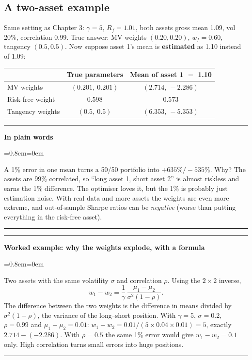 \documentclass[11pt,a4paper]{report}
\newenvironment{notebox}[1]
  {\par\medskip\Needspace{6\baselineskip}\noindent\rule{\linewidth}{0.4pt}\par\nopagebreak
   \noindent\textbf{#1}\par\nopagebreak
   \begin{list}{}{\leftmargin=0.8em\rightmargin=0em\topsep=2pt}\item[]}
  {\end{list}\nopagebreak\noindent\rule{\linewidth}{0.4pt}\par\medskip}
\newenvironment{plainbox}{\begin{notebox}{In plain words}}{\end{notebox}}
\newenvironment{workedex}[1][]{\begin{notebox}{Worked example#1}}{\end{notebox}}
\begin{document}
\subsection{A two-asset example}
Same setting as Chapter 3: $\gamma=5$, $R_f=1.01$, both assets gross mean 1.09, vol
20\%, correlation 0.99. True answer: MV weights $(0.20,0.20)$, $w_f=0.60$,
tangency $(0.5,0.5)$. Now suppose asset 1's mean is \textbf{estimated} as 1.10 instead of 1.09:
\begin{center}
\begin{tabular}{@{}lcc@{}}
\toprule
 & True parameters & Mean of asset 1 $=$ 1.10 \\
\midrule
MV weights & $(0.201,\ 0.201)$ & $(2.714,\ -2.286)$ \\
Risk-free weight & 0.598 & 0.573 \\
Tangency weights & $(0.5,\ 0.5)$ & $(6.353,\ -5.353)$ \\
\bottomrule
\end{tabular}
\end{center}
\begin{plainbox}
A 1\% error in one mean turns a 50/50 portfolio into $+635\%/-535\%$. Why? The
assets are 99\% correlated, so ``long asset 1, short asset 2'' is almost riskless
and earns the 1\% difference. The optimiser loves it, but the 1\% is probably
just estimation noise. With real data and more assets the weights are even more
extreme, and out-of-sample Sharpe ratios can be \emph{negative} (worse than
putting everything in the risk-free asset).
\end{plainbox}


\begin{workedex}[: why the weights explode, with a formula]
Two assets with the same volatility $\sigma$ and correlation $\rho$. Using the
$2\times2$ inverse,
\[
w_1-w_2=\frac{1}{\gamma}\,\frac{\mu_1-\mu_2}{\sigma^2(1-\rho)} .
\]
The difference between the two weights is the difference in means divided by
$\sigma^2(1-\rho)$, the variance of the long--short position. With $\gamma=5$,
$\sigma=0.2$, $\rho=0.99$ and $\mu_1-\mu_2=0.01$:
$w_1-w_2=0.01/(5\times0.04\times0.01)=5$, exactly $2.714-(-2.286)$. With $\rho=0.5$
the same 1\% error would give $w_1-w_2=0.1$ only. High correlation turns small
errors into huge positions.
\end{workedex}
\end{document}
